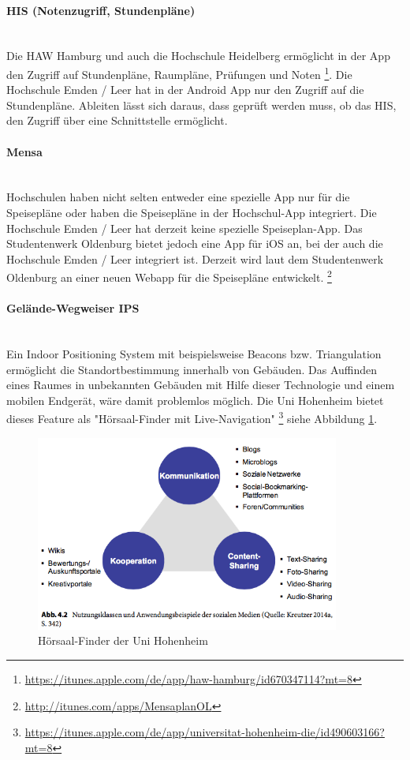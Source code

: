\paragraph{HIS (Notenzugriff, Stundenpläne)}\mbox{}\\ %
Die HAW Hamburg und auch die Hochschule Heidelberg ermöglicht in der App den Zugriff auf Stundenpläne, Raumpläne, Prüfungen und Noten \footnote{\url{https://itunes.apple.com/de/app/haw-hamburg/id670347114?mt=8}}. Die Hochschule Emden / Leer hat in der Android App nur den Zugriff auf die Stundenpläne. Ableiten lässt sich daraus, dass geprüft werden muss, ob das HIS, den Zugriff über eine Schnittstelle ermöglicht.

\paragraph{Mensa}\mbox{}\\ %
Hochschulen haben nicht selten entweder eine spezielle App nur für die Speisepläne oder haben die Speisepläne in der Hochschul-App integriert. Die Hochschule Emden / Leer hat derzeit keine spezielle Speiseplan-App. Das Studentenwerk Oldenburg bietet jedoch eine App für iOS an, bei der auch die Hochschule Emden / Leer integriert ist. Derzeit wird laut dem Studentenwerk Oldenburg an einer neuen Webapp für die Speisepläne entwickelt. \footnote{\url{http://itunes.com/apps/MensaplanOL}}

\paragraph{Gelände-Wegweiser IPS}\mbox{}\\ %
Ein Indoor Positioning System mit beispielsweise Beacons bzw. Triangulation ermöglicht die Standortbestimmung innerhalb von Gebäuden. Das Auffinden eines Raumes in unbekannten Gebäuden mit Hilfe dieser Technologie und einem mobilen Endgerät, wäre damit problemlos möglich. Die Uni Hohenheim bietet dieses Feature als "Hörsaal-Finder mit Live-Navigation" \footnote{\url{https://itunes.apple.com/de/app/universitat-hohenheim-die/id490603166?mt=8}} siehe Abbildung \ref{fig_livenavi}.

\begin{figure}[h!]
	\centering
	\includegraphics[width=10cm]{kapitel/gruppe1_2/bilder/nutzungsklassen}
	\caption{Hörsaal-Finder der Uni Hohenheim}
	\label{fig_livenavi}
\end{figure}
